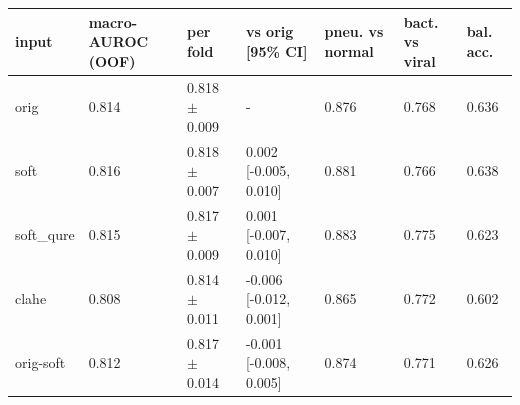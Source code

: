 \begin{tabular}{lllllll}
\toprule
input & macro-AUROC (OOF) & per fold & vs orig [95\% CI] & pneu. vs normal & bact. vs viral & bal. acc. \\
\midrule
orig & 0.814 & 0.818 $\pm$ 0.009 & - & 0.876 & 0.768 & 0.636 \\
soft & 0.816 & 0.818 $\pm$ 0.007 & 0.002 [-0.005, 0.010] & 0.881 & 0.766 & 0.638 \\
soft\_qure & 0.815 & 0.817 $\pm$ 0.009 & 0.001 [-0.007, 0.010] & 0.883 & 0.775 & 0.623 \\
clahe & 0.808 & 0.814 $\pm$ 0.011 & -0.006 [-0.012, 0.001] & 0.865 & 0.772 & 0.602 \\
orig-soft & 0.812 & 0.817 $\pm$ 0.014 & -0.001 [-0.008, 0.005] & 0.874 & 0.771 & 0.626 \\
\bottomrule
\end{tabular}
